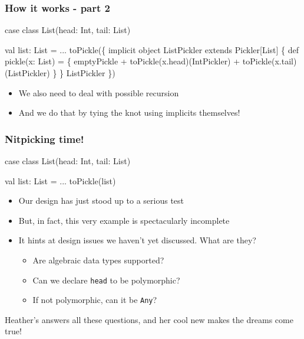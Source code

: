 \documentclass[svgnames,hyperref={bookmarks=false}]{beamer}
\begin{document}
\begin{frame}[t, fragile]
\frametitle{How it works - part 2}

\begin{semiverbatim}
case class List(head: Int, tail: List)

val list: List = ...
toPickle(\{
  \alert{implicit object ListPickler} extends Pickler[List] \{
    def pickle(x: List) = \{
      emptyPickle +
      toPickle(x.head)(IntPickler) +
      toPickle(x.tail)(\alert{ListPickler})
    \}
  \}
  ListPickler
\})
\end{semiverbatim}

\begin{itemize}
\item We also need to deal with possible recursion
\item And we do that by tying the knot using implicits themselves!
\end{itemize}
\end{frame}

\begin{frame}[t, fragile]
\frametitle{Nitpicking time!}

\begin{semiverbatim}
case class List(head: Int, tail: List)

val list: List = ...
toPickle(list)

\end{semiverbatim}

\begin{itemize}
\item Our design has just stood up to a serious test
\item But, in fact, this very example is spectacularly incomplete
\item It hints at design issues we haven't yet discussed. What are they?
\pause
\begin{itemize}
\item Are algebraic data types supported?
\item Can we declare \texttt{head} to be polymorphic?
\item If not polymorphic, can it be \texttt{Any}?
\end{itemize}
\end{itemize}

\vskip15pt
Heather's  answers all these questions, and her
cool new  makes the dreams come true!
\end{frame}
\end{document}
